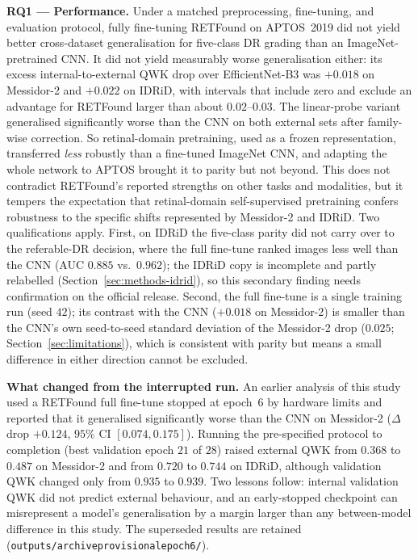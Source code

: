 \documentclass[journal]{IEEEtran}
\renewcommand{\_}{\origunderscore\allowbreak}
\begin{document}
\textbf{RQ1 --- Performance.} Under a matched preprocessing, fine-tuning, and
evaluation protocol, fully fine-tuning RETFound on APTOS~2019 did not yield
better cross-dataset generalisation for five-class DR grading than an
ImageNet-pretrained CNN. It did not yield measurably worse generalisation
either: its excess internal-to-external QWK drop over EfficientNet-B3 was
$+0.018$ on Messidor-2 and $+0.022$ on IDRiD, with intervals that include zero
and exclude an advantage for RETFound larger than about $0.02$--$0.03$. The
linear-probe variant generalised significantly worse than the CNN on both
external sets after family-wise correction. So retinal-domain pretraining,
used as a frozen representation, transferred \emph{less} robustly than a
fine-tuned ImageNet CNN, and adapting the whole network to APTOS brought it to
parity but not beyond. This does not contradict RETFound's reported strengths on
other tasks and modalities, but it tempers the expectation that retinal-domain
self-supervised pretraining confers robustness to the specific shifts
represented by Messidor-2 and IDRiD. Two qualifications apply. First, on IDRiD
the five-class parity did not carry over to the referable-DR decision, where the
full fine-tune ranked images less well than the CNN (AUC $0.885$ vs.\ $0.962$);
the IDRiD copy is incomplete and partly relabelled
(Section~\ref{sec:methods-idrid}), so this secondary finding needs confirmation on
the official release. Second, the full fine-tune is a single training run (seed
$42$); its contrast with the CNN ($+0.018$ on Messidor-2) is smaller than the
CNN's own seed-to-seed standard deviation of the Messidor-2 drop ($0.025$;
Section~\ref{sec:limitations}), which is consistent with parity but means a
small difference in either direction cannot be excluded.

\textbf{What changed from the interrupted run.} An earlier analysis of this study
used a RETFound full fine-tune stopped at epoch~$6$ by hardware limits and
reported that it generalised significantly worse than the CNN on Messidor-2
($\Delta$drop $+0.124$, $95\%$ CI $[0.074,0.175]$). Running the pre-specified
protocol to completion (best validation epoch $21$ of $28$) raised external QWK
from $0.368$ to $0.487$ on Messidor-2 and from $0.720$ to $0.744$ on IDRiD,
although validation QWK changed only from $0.935$ to $0.939$. Two lessons
follow: internal validation QWK did not predict external behaviour, and an
early-stopped checkpoint can misrepresent a model's generalisation by a margin
larger than any between-model difference in this study. The superseded results
are retained (\texttt{outputs/\allowbreak{}\_archive\_provisional\_epoch6/}).
\end{document}
